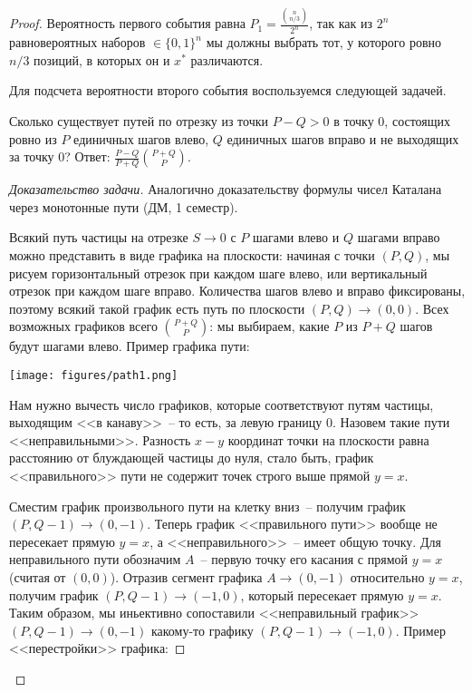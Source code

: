 \begin{proof}
Вероятность первого события равна $P_1 = \frac{{n\choose{n/3}}}{2^n}$, так как из $2^n$ равновероятных наборов $\in \{0, 1\}^n$ мы должны выбрать тот, у которого ровно $n/3$ позиций, в которых он и $x^*$ различаются.

Для подсчета вероятности второго события воспользуемся следующей задачей.

\begin{theorem*}
Сколько существует путей по отрезку из точки $P-Q>0$ в точку $0$, состоящих ровно из $P$ единичных шагов влево, $Q$ единичных шагов вправо и не выходящих за точку 0? Ответ: $\frac{P-Q}{P+Q} {P+Q\choose P}$.
\end{theorem*}
\begin{proof}[Доказательство задачи]
    Аналогично доказательству формулы чисел Каталана через монотонные пути (ДМ, 1 семестр). 
    
    Всякий путь частицы на отрезке $S \rightarrow 0$ с $P$ шагами влево и $Q$ шагами вправо можно представить в виде графика на плоскости: начиная с точки $(P, Q)$, мы рисуем горизонтальный отрезок при каждом шаге влево, или вертикальный отрезок при каждом шаге вправо. Количества шагов влево и вправо фиксированы, поэтому всякий такой график есть путь по плоскости $(P, Q) \rightarrow (0, 0)$. Всех возможных графиков всего ${P+Q \choose P}$: мы выбираем, какие $P$ из $P+Q$ шагов будут шагами влево. Пример графика пути:
    
    \begin{center}
        \texttt{[image: figures/path1.png]}
    \end{center}
    
    Нам нужно вычесть число графиков, которые соответствуют путям частицы, выходящим <<в канаву>>~-- то есть, за левую границу 0. Назовем такие пути <<неправильными>>. Разность $x-y$ координат точки на плоскости равна расстоянию от блуждающей частицы до нуля, стало быть, график <<правильного>> пути не содержит точек строго выше прямой $y=x$. 
    
    Сместим график произвольного пути на клетку вниз~-- получим график $(P, Q-1)\rightarrow (0, -1)$. Теперь график <<правильного пути>> вообще не пересекает прямую $y=x$, а <<неправильного>>~-- имеет общую точку. Для неправильного пути обозначим $A$~-- первую точку его касания с прямой $y=x$ (считая от $(0, 0)$). Отразив сегмент графика $A \rightarrow (0, -1)$ относительно $y=x$, получим график $(P, Q-1) \rightarrow (-1, 0)$, который пересекает прямую $y=x$. Таким образом, мы иньективно сопоставили <<неправильный график>> $(P, Q-1)\rightarrow (0, -1)$ какому-то графику $(P, Q-1) \rightarrow (-1, 0)$. Пример <<перестройки>> графика: 
    

\end{proof}
\end{proof}
